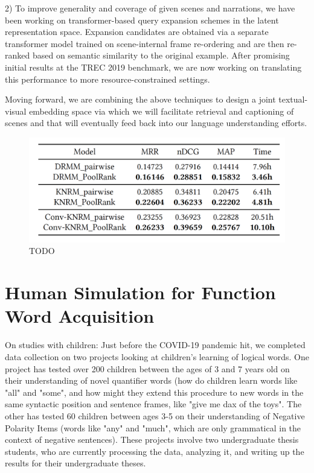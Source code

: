 \documentclass[11pt]{article}
\begin{document}
2) To improve generality and coverage of given scenes and narrations, we have been working on transformer-based query expansion schemes in the latent representation space. Expansion candidates are obtained via a separate transformer model trained on scene-internal frame re-ordering and are then re-ranked based on semantic similarity to the original example. After promising initial results at the TREC 2019 benchmark, we are now working on translating this performance to more resource-constrained settings.

Moving forward, we are combining the above techniques to design a joint textual-visual embedding space via which we will facilitate retrieval and captioning of scenes and that will eventually feed back into our language understanding efforts. 

\begin{figure}[ht!]
\centering
\includegraphics[width=.6\linewidth]{figures/ir-table}
\caption{TODO}
\end{figure}


\section{Human Simulation for Function Word Acquisition} 
\label{sec:hsr}

On studies with children: Just before the COVID-19 pandemic hit, we completed data collection on two projects looking at children's learning of logical words. One project has tested over 200 children between the ages of 3 and 7 years old on their understanding of novel quantifier words (how do children learn words like "all" and "some", and how might they extend this procedure to new words in the same syntactic position and sentence frames, like "give me dax of the toys". The other has tested 60 children between ages 3-5 on their understanding of Negative Polarity Items (words like "any" and "much", which are only grammatical in the context of negative sentences). These projects involve two undergraduate thesis students, who are currently processing the data, analyzing it, and writing up the results for their undergraduate theses.
\end{document}
